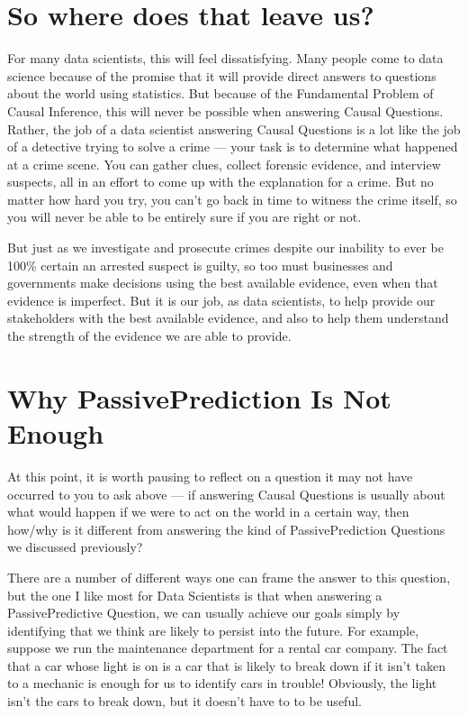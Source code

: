 \documentclass[letterpaper,10pt,english]{jupyterBook}
\begin{document}
\section{So where does that leave us?}
\label{\detokenize{30_questions/30_causal_questions_theory:so-where-does-that-leave-us}}
\sphinxAtStartPar
For many data scientists, this will feel  dissatisfying. Many people come to data science because of the promise that it will provide direct answers to questions about the world using statistics. But because of the Fundamental Problem of Causal Inference, this will never be possible when answering Causal Questions. Rather, the job of a data scientist answering Causal Questions is a lot like the job of a detective trying to solve a crime — your task is to determine what  happened at a crime scene. You can gather clues, collect forensic evidence, and interview suspects, all in an effort to come up with the  explanation for a crime. But no matter how hard you try, you can’t go back in time to witness the crime itself, so you will never be able to be entirely sure if you are right or not.

\sphinxAtStartPar
But just as we investigate and prosecute crimes despite our inability to ever be 100\% certain an arrested suspect is guilty, so too must businesses and governments make decisions using the best available evidence, even when that evidence is imperfect. But it is our job, as data scientists, to help provide our stakeholders with the best available evidence, and also to help them understand the strength of the evidence we are able to provide.


\section{Why Passive\sphinxhyphen{}Prediction Is Not Enough}
\label{\detokenize{30_questions/30_causal_questions_theory:why-passive-prediction-is-not-enough}}
\sphinxAtStartPar
At this point, it is worth pausing to reflect on a question it may not have occurred to you to ask above — if answering Causal Questions is usually about  what would happen if we were to act on the world in a certain way, then how/why is it different from answering the kind of Passive\sphinxhyphen{}Prediction Questions we discussed previously?

\sphinxAtStartPar
There are a number of different ways one can frame the answer to this question, but the one I like most for Data Scientists is that  when answering a Passive\sphinxhyphen{}Predictive Question, we can usually achieve our goals simply by identifying  that we think are likely to persist into the future. For example, suppose we run the maintenance department for a rental car company. The fact that a car whose  light is on is a car that is likely to break down if it isn’t taken to a mechanic is enough for us to identify cars in trouble! Obviously, the  light isn’t  the cars to break down, but it doesn’t have to to be useful.
\end{document}
